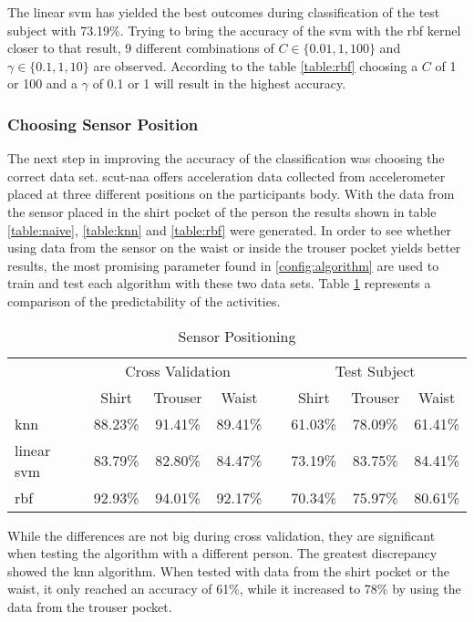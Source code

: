The linear \gls{svm} has yielded the best outcomes during classification of the test subject with 73.19\%. Trying to bring the accuracy of the \gls{svm} with the \gls{rbf} kernel closer to that result, 9 different combinations of $C\in\{0.01, 1, 100\}$ and $\gamma\in\{0.1, 1, 10\}$ are observed. According to the table \ref{table:rbf} choosing a $C$ of 1 or 100 and a $\gamma$ of 0.1 or 1 will result in the highest accuracy.


\subsubsection{Choosing Sensor Position}
The next step in improving the accuracy of the classification was choosing the correct data set. \gls{scut-naa} offers acceleration data collected from accelerometer placed at three different positions on the participants body. With the data from the sensor placed in the shirt pocket of the person the results shown in table \ref{table:naive}, \ref{table:knn} and \ref{table:rbf} were generated. In order to see whether using data from the sensor on the waist or inside the trouser pocket yields better results, the most promising parameter found in \ref{config:algorithm} are used to train and test each algorithm with these two data sets. Table \ref{table:sensor} represents a comparison of the predictability of the activities.

\begin{table}[!htb]
    \centering
    \begin{tabular}{@{}lccccccc@{}}
        \toprule
         & \multicolumn{3}{c}{Cross Validation} & & \multicolumn{3}{c}{Test Subject} \\
        \cmidrule(lr){2-4} \cmidrule(l){6-8} 
         & Shirt & Trouser & Waist &  & Shirt & Trouser & Waist \\
        \midrule
        \gls{knn}        & 88.23\% & 91.41\% & 89.41\% & & 61.03\% & 78.09\% & 61.41\% \\
        linear \gls{svm} & 83.79\% & 82.80\% & 84.47\% & & 73.19\% & 83.75\% & 84.41\% \\
        \gls{rbf}        & 92.93\% & 94.01\% & 92.17\% & & 70.34\% & 75.97\% & 80.61\% \\
        \bottomrule
    \end{tabular}
    \caption{Sensor Positioning}
    \label{table:sensor}
\end{table}

While the differences are not big during cross validation, they are significant when testing the algorithm with a different person. The greatest discrepancy showed the \gls{knn} algorithm. When tested with data from the shirt pocket or the waist, it only reached an accuracy of 61\%, while it increased to 78\% by using the data from the trouser pocket.

